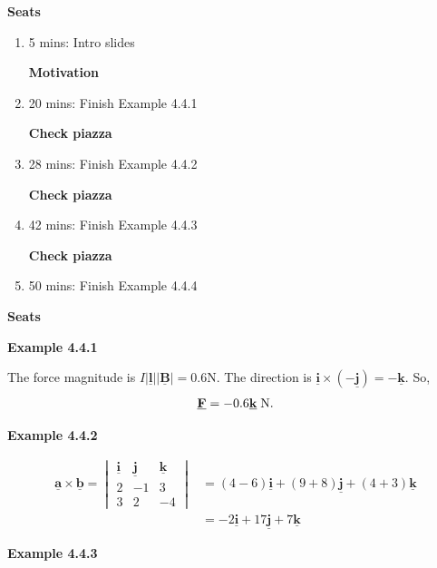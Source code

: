 \textbf{Seats}
\begin{enumerate}
    \item 5 mins: Intro slides \par
    \textbf{Motivation}
    \item 20 mins: Finish Example 4.4.1 \par
    \textbf{Check piazza}
    \item 28 mins: Finish Example 4.4.2 \par
    \textbf{Check piazza}
    \item 42 mins: Finish Example 4.4.3 \par
    \textbf{Check piazza}
    \item 50 mins: Finish Example 4.4.4 \par
\end{enumerate}
\textbf{Seats}

\newcommand{\vect}[1]{\underline{\mathbf{#1}}}

\vspace{5mm} 
\textbf{Example 4.4.1} \par

The force magnitude is
$I|\vect{l}||\vect{B}|=0.6$N. The direction is $\vect{i} \times (-\vect{j}) = -\vect{k}$. So,
\begin{align*}
    \vect{F} = -0.6\vect{k} \; {\rm N}.
\end{align*}

\vspace{5mm} 
\textbf{Example 4.4.2} \par

\begin{align*}
\vect{a}\times\vect{b} = \begin{vmatrix}
    \vect{i} & \vect{j} & \vect{k}\\
    2 & -1 & 3\\
    3 & 2 & -4
\end{vmatrix} &= (4-6)\vect{i} + (9+8)\vect{j} + (4+3)\vect{k} \\
&= -2\vect{i} + 17\vect{j} + 7\vect{k}
\end{align*}

\textbf{Example 4.4.3} \par

